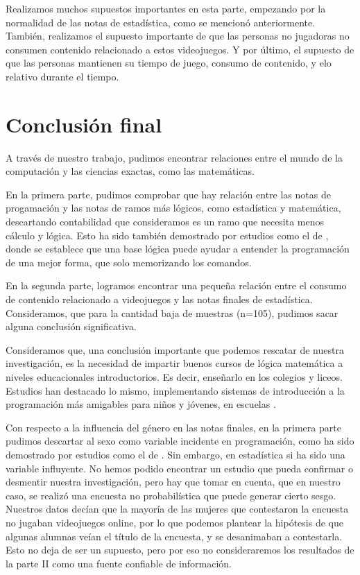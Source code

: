 \documentclass[11pt]{article}
\begin{document}
Realizamos muchos supuestos importantes en esta parte, empezando por la normalidad de las notas de estadística, como se mencionó anteriormente. También, realizamos el supuesto importante de que las personas no jugadoras no consumen contenido relacionado a estos videojuegos. Y por último, el supuesto de que las personas mantienen su tiempo de juego, consumo de contenido, y elo relativo durante el tiempo.


\newpage

\section{Conclusión final}

A través de nuestro trabajo, pudimos encontrar relaciones entre el mundo de la computación y las ciencias exactas, como las matemáticas.

En la primera parte, pudimos comprobar que hay relación entre las notas de progamación y las notas de ramos más lógicos, como estadística y matemática, descartando contabilidad que consideramos es un ramo que necesita menos cálculo y lógica. Esto ha sido también demostrado por estudios como el de , donde se establece que una base lógica puede ayudar a entender la programación de una mejor forma, que solo memorizando los comandos.

En la segunda parte, logramos encontrar una pequeña relación entre el consumo de contenido relacionado a videojuegos y las notas finales de estadística. Consideramos, que para la cantidad baja de muestras (n=105), pudimos sacar alguna conclusión significativa. 

Consideramos que, una conclusión importante que podemos rescatar de nuestra investigación, es la necesidad de impartir buenos cursos de lógica matemática a niveles educacionales introductorios. Es decir, enseñarlo en los colegios y liceos. Estudios han destacado lo mismo, implementando sistemas de introducción a la programación más amigables para niños y jóvenes, en escuelas .

Con respecto a la influencia del género en las notas finales, en la primera parte pudimos descartar al sexo como variable incidente en programación, como ha sido demostrado por estudios como el de . Sin embargo, en estadística si ha sido una variable influyente. No hemos podido encontrar un estudio que pueda confirmar o desmentir nuestra investigación, pero hay que tomar en cuenta, que en nuestro caso, se realizó una encuesta no probabilística que puede generar cierto sesgo. Nuestros datos decían que la mayoría de las mujeres que contestaron la encuesta no jugaban videojuegos online, por lo que podemos plantear la hipótesis de que algunas alumnas veían el título de la encuesta, y se desanimaban a contestarla. Esto no deja de ser un supuesto, pero por eso no consideraremos los resultados de la parte II como una fuente confiable de información.
\end{document}
